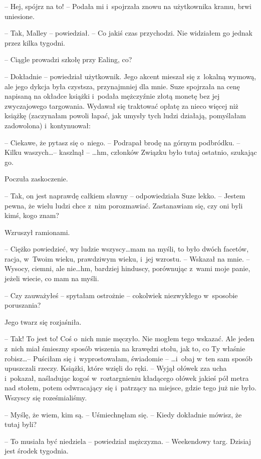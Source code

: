 \documentclass[oneside,polish,11pt,sfheadings]{mwbk}
\begin{document}
-- Hej, spójrz na
to! -- Podała mi i~spojrzała znowu na użytkownika kramu, brwi uniesione.

-- Tak, Malley -- powiedział. -- Co jakiś czas przychodzi. Nie widziałem go
jednak przez kilka tygodni.

-- Ciągle prowadzi szkołę przy Ealing, co?

-- Dokładnie -- powiedział użytkownik. Jego akcent mieszał się z~lokalną
wymową, ale jego dykcja była czystsza, przynajmniej dla mnie. Suze
spojrzała na cenę napisaną na okładce książki i~podała mężczyźnie złotą
monetę bez jej zwyczajowego targowania. Wydawał się traktować opłatę za
nieco więcej niż książkę (zaczynałam powoli łapać, jak umysły tych ludzi
działają, pomyślałam zadowolona) i~kontynuował:

-- Ciekawe, że pytasz się o~niego. -- Podrapał brodę na górnym podbródku.
-- Kilku waszych\ldots  -- kaszlnął -- \ldots  hm, członków Związku było tutaj
ostatnio, szukając go.

Poczuła zaskoczenie.

-- Tak, on jest naprawdę całkiem sławny -- odpowiedziała Suze lekko. -- Jestem pewna, że wielu ludzi chce z~nim porozmawiać. Zastanawiam się,
czy oni byli kimś, kogo znam?

Wzruszył ramionami. 

-- Ciężko powiedzieć, wy ludzie wszyscy\ldots  mam na
myśli, to było dwóch facetów, racja, w~Twoim wieku, prawdziwym wieku, i~jej wzrostu. -- Wskazał na mnie. -- Wysocy, ciemni, ale nie\ldots  hm,
bardziej hinduscy, porównując z~wami moje panie, jeżeli wiecie, co mam
na myśli.

-- Czy zauważyłeś -- spytałam ostrożnie -- cokolwiek niezwykłego w~sposobie
poruszania?

Jego twarz się rozjaśniła. 

-- Tak! To jest to! Coś o~nich mnie męczyło.
Nie mogłem tego wskazać. Ale jeden z~nich miał śmieszny sposób wiszenia
na krawędzi stołu, jak to, co Ty właśnie robisz\ldots  -- Puściłam się i~wyprostowałam, świadomie -- \ldots  i~obaj w~ten sam sposób upuszczali
rzeczy. Książki, które wzięli do ręki. -- Wyjął ołówek zza ucha i~pokazał, naśladując kogoś w~roztargnieniu kładącego ołówek jakieś pół
metra nad stołem, potem odwracający się i~patrzący na miejsce, gdzie
tego już nie było. Wszyscy się roześmialiśmy.

-- Myślę, że wiem, kim są. -- Uśmiechnęłam się. -- Kiedy dokładnie mówisz,
że tutaj byli?

-- To musiała być niedziela -- powiedział mężczyzna. -- Weekendowy targ.
Dzisiaj jest środek tygodnia.
\end{document}
